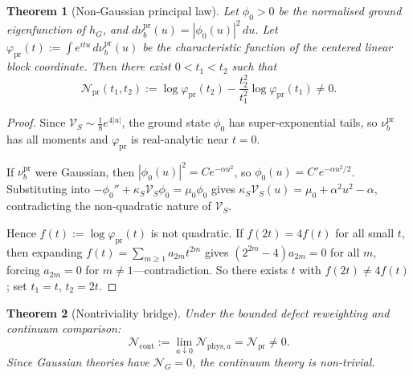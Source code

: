 \documentclass[12pt]{article}
\theoremstyle{plain}
\newtheorem{theorem}{Theorem}[section]
\theoremstyle{definition}
\numberwithin{equation}{section}
\newcommand{\pr}{\mathrm{pr}}
\newcommand{\phys}{\mathrm{phys}}
\begin{document}
\begin{theorem}[Non-Gaussian principal law]\label{thm:nonGaussian}
Let $\phi_0>0$ be the normalised ground eigenfunction of $h_G$, and $d\nu_b^{\pr}(u)=|\phi_0(u)|^2\,du$.  Let $\varphi_{\pr}(t):=\int e^{itu}\,d\nu_b^{\pr}(u)$ be the characteristic function of the centered linear block coordinate.  Then there exist $0<t_1<t_2$ such that
\begin{equation}
\mathcal{N}_{\pr}(t_1,t_2) := \log\varphi_{\pr}(t_2) - \frac{t_2^2}{t_1^2}\log\varphi_{\pr}(t_1) \neq 0.
\end{equation}
\end{theorem}

\begin{proof}
Since $\mathcal{V}_S\sim\frac{1}{8}e^{4|u|}$, the ground state $\phi_0$ has super-exponential tails, so $\nu_b^{\pr}$ has all moments and $\varphi_{\pr}$ is real-analytic near $t=0$.

If $\nu_b^{\pr}$ were Gaussian, then $|\phi_0(u)|^2=Ce^{-\alpha u^2}$, so $\phi_0(u)=C'e^{-\alpha u^2/2}$.  Substituting into $-\phi_0''+\kappa_S\mathcal{V}_S\phi_0=\mu_0\phi_0$ gives $\kappa_S\mathcal{V}_S(u)=\mu_0+\alpha^2 u^2-\alpha$, contradicting the non-quadratic nature of $\mathcal{V}_S$.

Hence $f(t):=\log\varphi_{\pr}(t)$ is not quadratic.  If $f(2t)=4f(t)$ for all small $t$, then expanding $f(t)=\sum_{m\geq 1}a_{2m}t^{2m}$ gives $(2^{2m}-4)a_{2m}=0$ for all $m$, forcing $a_{2m}=0$ for $m\neq 1$---contradiction.  So there exists $t$ with $f(2t)\neq 4f(t)$; set $t_1=t$, $t_2=2t$.
\end{proof}

\begin{theorem}[Nontriviality bridge]\label{thm:nontriviality}
Under the bounded defect reweighting and continuum comparison:
\begin{equation}
\mathcal{N}_{\mathrm{cont}} := \lim_{a\downarrow 0}\mathcal{N}_{\phys,a} = \mathcal{N}_{\pr} \neq 0.
\end{equation}
Since Gaussian theories have $\mathcal{N}_G=0$, the continuum theory is non-trivial.
\end{theorem}
\end{document}
